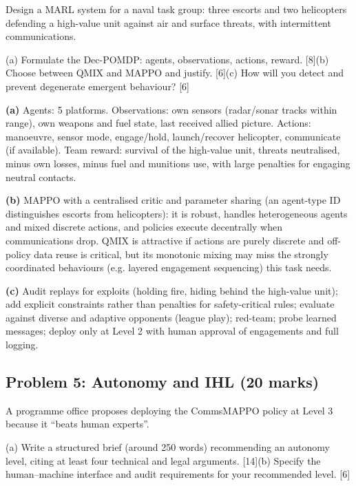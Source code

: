 \documentclass[11pt]{article}
\begin{document}
\begin{prob}Design a MARL system for a naval task group: three escorts and two helicopters defending a high-value unit against air and surface threats, with intermittent communications.

(a) Formulate the Dec-POMDP: agents, observations, actions, reward. [8]\newline (b) Choose between QMIX and MAPPO and justify. [6]\newline (c) How will you detect and prevent degenerate emergent behaviour? [6]\end{prob}

\begin{soln}\textbf{(a)} Agents: 5 platforms. Observations: own sensors (radar/sonar tracks within range), own weapons and fuel state, last received allied picture. Actions: manoeuvre, sensor mode, engage/hold, launch/recover helicopter, communicate (if available). Team reward: survival of the high-value unit, threats neutralised, minus own losses, minus fuel and munitions use, with large penalties for engaging neutral contacts.

\textbf{(b)} MAPPO with a centralised critic and parameter sharing (an agent-type ID distinguishes escorts from helicopters): it is robust, handles heterogeneous agents and mixed discrete actions, and policies execute decentrally when communications drop. QMIX is attractive if actions are purely discrete and off-policy data reuse is critical, but its monotonic mixing may miss the strongly coordinated behaviours (e.g. layered engagement sequencing) this task needs.

\textbf{(c)} Audit replays for exploits (holding fire, hiding behind the high-value unit); add explicit constraints rather than penalties for safety-critical rules; evaluate against diverse and adaptive opponents (league play); red-team; probe learned messages; deploy only at Level 2 with human approval of engagements and full logging.\end{soln}

\subsection{Problem 5: Autonomy and IHL \normalfont\small\color{GreyN}(20 marks)}

\begin{prob}A programme office proposes deploying the CommsMAPPO policy at Level 3 because it ``beats human experts''.

(a) Write a structured brief (around 250 words) recommending an autonomy level, citing at least four technical and legal arguments. [14]\newline (b) Specify the human--machine interface and audit requirements for your recommended level. [6]\end{prob}
\end{document}
